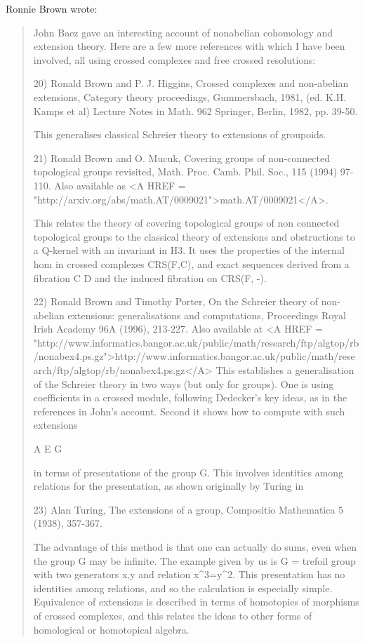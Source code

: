 Ronnie Brown wrote:

\begin{quote}
 John Baez gave an interesting account of nonabelian cohomology and
 extension theory.  Here are a few more references with which I have been
 involved, all using crossed complexes and free crossed resolutions:

20) 
 Ronald Brown and P. J. Higgins, Crossed complexes and non-abelian
 extensions, Category theory proceedings, Gummersbach,
 1981, (ed. K.H. Kamps et al) Lecture Notes in Math. 962 
 Springer, Berlin, 1982, pp. 39-50.

 This generalises classical Schreier theory to extensions of groupoids.

21)
Ronald Brown and O. Mucuk, 
Covering groups of non-connected 
 topological groups revisited, Math. Proc. Camb. Phil. 
 Soc., 115 (1994) 97-110.  Also available as 
 <A HREF = "http://arxiv.org/abs/math.AT/0009021">math.AT/0009021</A>.

 This relates the theory of covering topological groups of non connected
 topological groups to the classical theory of extensions and
 obstructions to a Q-kernel with an invariant in H3.  It uses the
 properties of the internal hom in crossed complexes CRS(F,C), and 
 exact sequences derived from a fibration C \to  D and the induced 
 fibration on CRS(F, -).

22) 
Ronald Brown and Timothy Porter,
On the Schreier theory of non-abelian
 extensions: generalisations and computations, Proceedings
 Royal Irish Academy 96A (1996), 213-227.
Also available at
<A HREF = "http://www.informatics.bangor.ac.uk/public/math/research/ftp/algtop/rb/nonabex4.ps.gz">http://www.informatics.bangor.ac.uk/public/math/research/ftp/algtop/rb/nonabex4.ps.gz</A>
 This establishes a generalisation of the Schreier theory in two ways 
 (but only for groups). One is using coefficients in a crossed module,
 following Dedecker's key ideas, as in the references in John's account.
 Second it shows how to compute with such extensions

 A \to  E \to  G

 in terms of presentations of the group G.  This involves identities
 among relations for the presentation, as shown originally by Turing in

23) 
 Alan Turing, The extensions of a group, Compositio Mathematica 5 (1938), 
 357-367.

 The advantage of this method is that one can actually do sums, even when
 the group G may be infinite.  The example given by us is G = trefoil group
 with two generators x,y and relation x^{3}=y^{2}. 
 This presentation has no
 identities among relations, and so the calculation is especially simple.
 Equivalence of extensions is described in terms of homotopies of
 morphisms of crossed complexes, and this relates the ideas to other
 forms of homological or homotopical algebra.


\end{quote}
